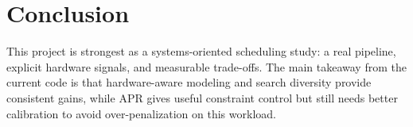 \documentclass[11pt]{article}
\begin{document}
\section{Conclusion}
This project is strongest as a systems-oriented scheduling study: a real pipeline, explicit hardware signals, and measurable trade-offs. The main takeaway from the current code is that hardware-aware modeling and search diversity provide consistent gains, while APR gives useful constraint control but still needs better calibration to avoid over-penalization on this workload.
\end{document}
